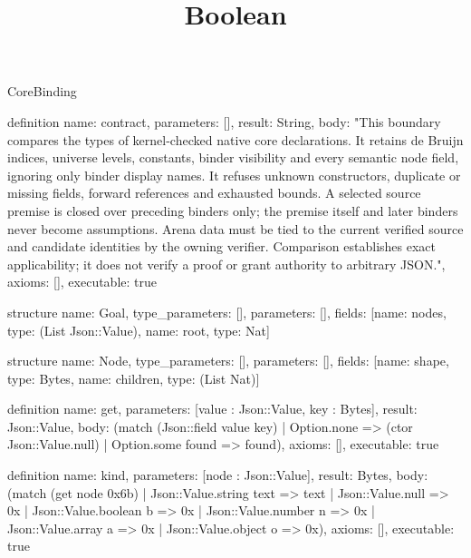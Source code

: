 \begin{lexlean}{CoreBinding}
\title{Boolean}
\begin{semanticmodule}

definition{
 name: contract,
 parameters: [],
 result: String,
 body: "This boundary compares the types of kernel-checked native core declarations. It retains de Bruijn indices, universe levels, constants, binder visibility and every semantic node field, ignoring only binder display names. It refuses unknown constructors, duplicate or missing fields, forward references and exhausted bounds. A selected source premise is closed over preceding binders only; the premise itself and later binders never become assumptions. Arena data must be tied to the current verified source and candidate identities by the owning verifier. Comparison establishes exact applicability; it does not verify a proof or grant authority to arbitrary JSON.",
 axioms: [],
 executable: true
}

structure{
 name: Goal,
 type_parameters: [],
 parameters: [],
 fields: [{name: nodes, type: (List Json::Value)}, {name: root, type: Nat}]
}

structure{
 name: Node,
 type_parameters: [],
 parameters: [],
 fields: [{name: shape, type: Bytes}, {name: children, type: (List Nat)}]
}

definition{
 name: get,
 parameters: [value : Json::Value, key : Bytes],
 result: Json::Value,
 body: (match (Json::field value key) | Option.none => (ctor Json::Value.null) | Option.some found => found),
 axioms: [],
 executable: true
}

definition{
 name: kind,
 parameters: [node : Json::Value],
 result: Bytes,
 body: (match (get node 0x6b) | Json::Value.string text => text | Json::Value.null => 0x | Json::Value.boolean b => 0x | Json::Value.number n => 0x | Json::Value.array a => 0x | Json::Value.object o => 0x),
 axioms: [],
 executable: true
}


\end{semanticmodule}
\end{lexlean}
